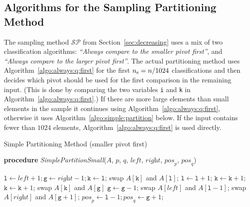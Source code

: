 \documentclass[prodmode,acmtalg]{acmsmall}
\newcommand{\Samplesize}{\ensuremath{n_{\textnormal{\textrm{s}}}}}
\begin{document}
\subsection{Algorithms for the Sampling Partitioning Method}\label{app:sec:our:algorithms}

The sampling method $\mathcal{SP}$ from Section~\ref{sec:decreasing} uses a mix of two
classification algorithms: \emph{``Always compare to the smaller pivot first''},
and \emph{``Always compare to the larger pivot first''}.  
The actual partitioning method uses
Algorithm~\ref{algo:always:q:first} for the first $\Samplesize = n / 1024$
classifications and then decides which pivot should be used for
the first comparison in the remaining input. (This is done by comparing the two variables \texttt{i} and
\texttt{k} in Algorithm~\ref{algo:always:q:first}.) If there are more large
elements than small elements in the sample it continues using
Algorithm~\ref{algo:always:q:first}, otherwise it uses
Algorithm~\ref{algo:simple:partition} below. If the input contains fewer than $1024$ elements, 
Algorithm~\ref{algo:always:q:first} is used directly.


\begin{algorithm}
    \caption{Simple Partitioning Method (smaller pivot first)}\samepage\label{algo:simple:partition}
		\textbf{procedure} \textit{SimplePartitionSmall}($\textit{A}$,
		$\textit{p}$, $\textit{q}$, $\textit{left}$,
		$\textit{right}$, $\textit{pos}_{\textit{p}}$, $\textit{pos}_{\textit{q}}$)
                \begin{algorithmic}[1]
		\State $\texttt{l} \gets \textit{left} +1; \texttt{g} \gets \textit{right} - 1; \texttt{k} \gets \texttt{l}$;
		\State swap $\textit{A}[\texttt{k}]$ and $\textit{A}[\texttt{l}]$;
		\State $\texttt{l} \gets \texttt{l} + 1$;
		\State $\texttt{k} \gets \texttt{k} + 1$;
		\Else
		\State $\texttt{k} \gets \texttt{k} + 1$;
		\Else
		\State swap $\textit{A}[\texttt{k}]$ and $\textit{A}[\texttt{g}]$
		\State $\texttt{g} \gets \texttt{g} - 1$;
		\EndIf
                \EndIf
                \EndWhile
		\State swap $\textit{A}[\textit{left}]$ and $\textit{A}[\texttt{l}-1]$;
		\State swap $\textit{A}[\textit{right}]$ and $\textit{A}[\texttt{g}+1]$;
		\State $\textit{pos}_{\textit{p}} \gets \texttt{l} - 1;  \textit{pos}_{\textit{q}} \gets \texttt{g} + 1$;
            \end{algorithmic}
    \end{algorithm}
\end{document}

